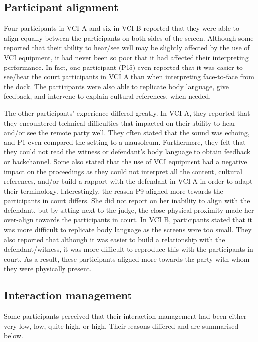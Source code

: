 \documentclass[output=paper]{langsci/langscibook}
\begin{document}
\subsection{Participant alignment}
Four participants in \textsc{VCI} A and six in \textsc{VCI} B reported that they were able to align equally between the participants on both sides of the screen. Although some reported that their ability to hear/see well may be slightly affected by the use of \textsc{VCI} equipment, it had never been so poor that it had affected their interpreting performance. In fact, one participant (P15) even reported that it was easier to see/hear the court participants in \textsc{VCI} A than when interpreting face-to-face from the dock. The participants were also able to replicate body language, give feedback, and intervene to explain cultural references, when needed. 

The other participants’ experience differed greatly. In \textsc{VCI} A, they reported that they encountered technical difficulties that impacted on their ability to hear and/or see the remote party well. They often stated that the sound was echoing, and P1 even compared the setting to a mausoleum. Furthermore, they felt that they could not read the witness or defendant’s body language to obtain feedback or backchannel. Some also stated that the use of \textsc{VCI} equipment had a negative impact on the proceedings as they could not interpret all the content, cultural references, and/or build a rapport with the defendant in \textsc{VCI} A in order to adapt their terminology. Interestingly, the reason P9 aligned more towards the participants in court differs. She did not report on her inability to align with the defendant, but by sitting next to the judge, the close physical proximity made her over-align towards the participants in court. In \textsc{VCI} B, participants stated that it was more difficult to replicate body language as the screens were too small. They also reported that although it was easier to build a relationship with the defendant/witness, it was more difficult to reproduce this with the participants in court. As a result, these participants aligned more towards the party with whom they were physically present. 

\subsection{Interaction management} 

Some participants perceived that their interaction management had been either very low, low, quite high, or high. Their reasons differed and are summarised below. 
\end{document}
